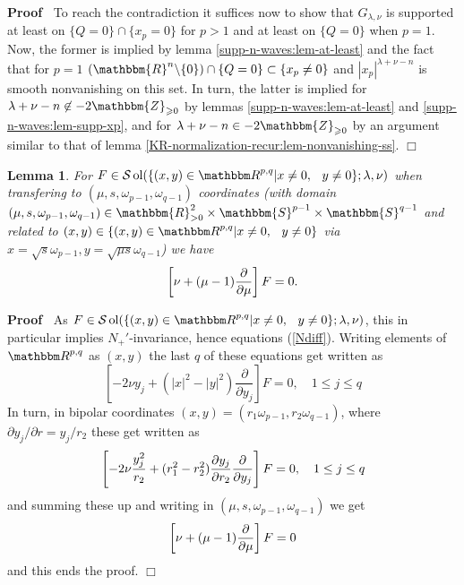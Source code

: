 \documentclass{article}
\newcommand{\nin}{\not\in}
\newcommand{\tmop}[1]{\ensuremath{\operatorname{#1}}}
\newenvironment{proof}{\noindent\textbf{Proof\ }}{\hspace*{\fill}$\Box$\medskip}
\numberwithin{definition}{section}
\newtheorem{lemma}{Lemma}
\numberwithin{lemma}{section}
\numberwithin{proposition}{section}
{\theorembodyfont{\rmfamily}\newtheorem{remark}{Remark}
\numberwithin{remark}{section}
}
\begin{document}
\begin{proof}
  To reach the contradiction it suffices now to show that $G_{\lambda, \nu}$
  is supported at least on $\{ Q = 0 \} \cap \{ x_p = 0 \}$ for $p > 1$ and at
  least on $\{ Q = 0 \}$ when $p = 1$. Now, the former is implied by lemma
  \ref{supp-n-waves:lem-at-least} and the fact that for $p = 1$ $(
  \mathbbm{R}^n \backslash \{ 0 \}) \cap \{ Q = 0 \} \subset \{ x_p \neq 0 \}$
  and $| x_p |^{\lambda + \nu - n}$ is smooth nonvanishing on this set. In
  turn, the latter is implied for $\lambda + \nu - n \nin -
  2\mathbbm{Z}_{\geqslant 0}$ by lemmas \ref{supp-n-waves:lem-at-least} and
  \ref{supp-n-waves:lem-supp-xp}, and for $\lambda + \nu - n \in -
  2\mathbbm{Z}_{\geqslant 0}$ by an argument similar to that of lemma
  \ref{KR-normalization-recur:lem-nonvanishing-ss}.
\end{proof}

\begin{lemma}
  \label{supp-Q:lem-operator}For $F \in \mathcal{S} \tmop{ol} (\{ (x, y) \in
  \R^{p, q} |x \neq 0, \hspace{0.75em} y \neq 0\}; \lambda, \nu)$ when
  transfering to $( \mu, s, \omega_{p - 1}, \omega_{q - 1})$ coordinates (with
  domain $( \mu, s, \omega_{p - 1}, \omega_{q - 1}) \in \mathbbm{R}_{> 0}^2
  \times \mathbbm{S}^{p - 1} \times \mathbbm{S}^{q - 1}$ and related to $( x,
  y) \in \{ (x, y) \in \R^{p, q} |x \neq 0, \hspace{0.75em} y \neq 0\}$ via $x
  = \sqrt{s} \omega_{p - 1}, y = \sqrt{\mu s} \omega_{q - 1}$) we have
  \[ \left[\nu + (\mu - 1)  \frac{\partial}{\partial \mu}\right] F = 0. \]
\end{lemma}

\begin{proof}
  As $F \in \mathcal{S} \tmop{ol} (\{ (x, y) \in \R^{p, q} |x \neq 0,
  \hspace{0.75em} y \neq 0\}; \lambda, \nu)$, this in particular implies
  $N_+'$-invariance, hence equations (\ref{Ndiff}). Writing elements of
  $\R^{p, q}$ as $(x, y)$ the last $q$ of these equations get written as
  \[ \left[ - 2 \nu y_j + ( | x |^2 - | y |^2) \frac{\partial}{\partial y_j}
     \right] F = 0, \hspace{1em} 1 \leq j \leq q \]
  In turn, in bipolar coordinates $(x, y) = (r_1 \omega_{p - 1}, r_2 \omega_{q
  - 1})$, where $\partial y_j / \partial r = y_j / r_2$ these get written as
  \[ \left[- 2 \nu \frac{y_j^2}{r_2} + (r_1^2 - r_2^2)  \frac{\partial
     y_j}{\partial r_2}  \frac{\partial}{\partial y_j}\right] F = 0, \hspace{1em} 1
     \leq j \leq q \]
  and summing these up and writing in $(\mu, s, \omega_{p - 1}, \omega_{q -
  1})$ we get
  \[ \left[\nu + (\mu - 1)  \frac{\partial}{\partial \mu}\right] F = 0 \]
  and this ends the proof.
\end{proof}
\end{document}

